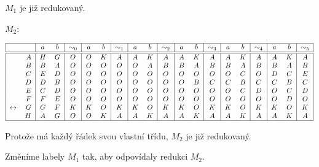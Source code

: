 $M_1$ je již redukovaný.

$M_2$:

\[
\begin{tabular}{|r r|c c|c|c c|c|c c|c|c c|c|c c|c|c c|c|}
    \hline
    & & $a$ & $b$ & $\sim_0$ & $a$ & $b$ & $\sim_1$ & $a$ & $b$ & $\sim_2$ & $a$ & $b$ & $\sim_3$ & $a$ & $b$ & $\sim_4$ & $a$ & $b$ & $\sim_5$\\
    \hline
    \hline
                     & $A$ &$H$ &$G$ &$O$ &$O$ &$K$ &$A$ &$A$ &$K$ &$A$ &$A$ &$K$ &$A$ &$A$ &$K$ &$A$ &$A$ &$K$ &$A$\\
                     & $B$ &$B$ &$A$ &$O$ &$O$ &$O$ &$O$ &$O$ &$A$ &$B$ &$B$ &$A$ &$B$ &$B$ &$A$ &$B$ &$B$ &$A$ &$B$\\
                     & $C$ &$E$ &$D$ &$O$ &$O$ &$O$ &$O$ &$O$ &$O$ &$O$ &$O$ &$O$ &$O$ &$O$ &$C$ &$O$ &$D$ &$C$ &$E$\\
                     & $D$ &$D$ &$B$ &$O$ &$O$ &$O$ &$O$ &$O$ &$O$ &$O$ &$O$ &$B$ &$C$ &$C$ &$B$ &$C$ &$C$ &$B$ &$C$\\
                     & $E$ &$C$ &$D$ &$O$ &$O$ &$O$ &$O$ &$O$ &$O$ &$O$ &$O$ &$O$ &$O$ &$O$ &$C$ &$D$ &$O$ &$C$ &$D$\\
                     & $F$ &$F$ &$E$ &$O$ &$O$ &$O$ &$O$ &$O$ &$O$ &$O$ &$O$ &$O$ &$O$ &$O$ &$O$ &$O$ &$O$ &$D$ &$O$\\
    $\leftrightarrow$& $G$ &$G$ &$F$ &$K$ &$K$ &$O$ &$K$ &$K$ &$O$ &$K$ &$K$ &$O$ &$K$ &$K$ &$O$ &$K$ &$K$ &$O$ &$K$\\
                     & $H$ &$A$ &$G$ &$O$ &$O$ &$K$ &$A$ &$A$ &$K$ &$A$ &$A$ &$K$ &$A$ &$A$ &$K$ &$A$ &$A$ &$K$ &$A$\\
    \hline
\end{tabular}
\]

Protože má každý řádek svou vlastní třídu, $M_2$ je již redukovaný.

Změníme labely $M_1$ tak, aby odpovídaly redukci $M_2$.

